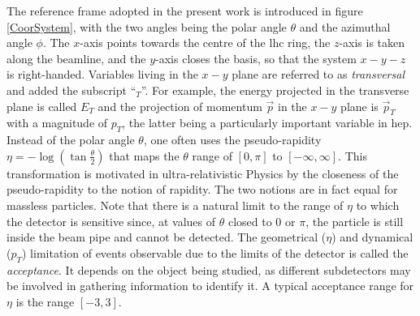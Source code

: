 The reference frame adopted in the present work is introduced in figure \ref{CoorSystem}, with the two angles being the polar angle $\theta$ and the azimuthal angle $\phi$. The $x$-axis points towards the centre of the \gls{lhc} ring, the $z$-axis is taken along the beamline, and the $y$-axis closes the basis, so that the system $x-y-z$ is right-handed. Variables living in the $x-y$ plane are referred to as \textit{transversal} and added the subscript ``$_T$''. For example, the energy projected in the transverse plane is called $E_T$ and the projection of momentum $\vec{p}$ in the $x-y$ plane is $\vec{p}_T$ with a magnitude of $p_T$, the latter being a particularly important variable in \gls{hep}. Instead of the polar angle $\theta$, one often uses the pseudo-rapidity $\eta = - \log \left( \tan \frac{\theta}{2} \right)$ that maps the $\theta$ range of $[0, \pi ]$ to $[ -\infty, \infty ]$. This transformation is motivated in ultra-relativistic Physics by the closeness of the pseudo-rapidity to the notion of rapidity. The two notions are in fact equal for massless particles. Note that there is a natural limit to the range of $\eta$ to which the detector is sensitive since, at values of $\theta$ closed to 0 or $\pi$, the particle is still inside the beam pipe and cannot be detected. The geometrical ($\eta$) and dynamical ($p_T$) limitation of events observable due to the limits of the detector is called the \textit{acceptance}. It depends on the object being studied, as different subdetectors may be involved in gathering information to identify it. A typical acceptance range for $\eta$ is the range $[-3, 3]$. 


